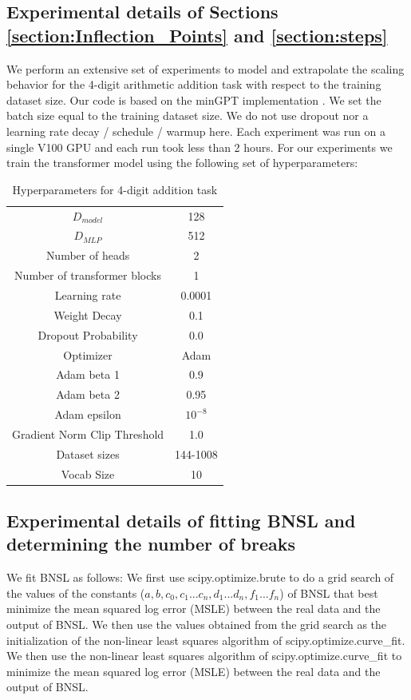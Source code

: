 \documentclass{article} %
\begin{document}
\subsection{Experimental details of Sections \ref{section:Inflection_Points} and \ref{section:steps}}
\label{section:Inflection_points_experimental}
We perform an extensive set of experiments to model and extrapolate the scaling behavior for the 4-digit arithmetic addition task with respect to the training dataset size. Our code is based on the minGPT implementation \citep{Karpathy2020}. We set the batch size equal to the training dataset size. We do not use dropout %
nor a learning rate decay / schedule / warmup here. Each experiment was run on a single V100 GPU and each run took less than 2 hours. For our experiments we train the transformer model using the following set of hyperparameters:
\begin{table}[hbt!]
    \centering
    \begin{tabular}{c|c}
         $D_{model}$ & 128 \\
         $D_{MLP}$ & 512 \\
         Number of heads & 2 \\
         Number of transformer blocks & 1 \\
         Learning rate & 0.0001\\
         Weight Decay & 0.1\\
         Dropout Probability & 0.0\\
         Optimizer & Adam %
         \\
         Adam beta 1 & 0.9\\
         Adam beta 2 & 0.95 \\
         Adam epsilon & $10^{-8}$\\
         Gradient Norm Clip Threshold & 1.0 \\
         Dataset sizes & 144-1008 \\
         Vocab Size & 10 \\
         
    \end{tabular}
    \caption{Hyperparameters for 4-digit addition task}
    \label{tab:my_label}
\end{table}

\subsection{Experimental details of fitting BNSL and determining the number of breaks}
\label{section:BNSL_fit_details}
We fit BNSL as follows:
We first use scipy.optimize.brute to do a grid search of the values of the constants ($a, b, c_0, c_1 ... c_n, d_1 ...  d_n, f_1 ... f_n$) of BNSL that best minimize the mean squared log error (MSLE) between the real data and the output of BNSL.
We then use the values obtained from the grid search as the initialization of the non-linear least squares algorithm of scipy.optimize.curve\_fit.
We then use the non-linear least squares algorithm of scipy.optimize.curve\_fit to minimize the mean squared log error (MSLE) between the real data and the output of BNSL.
\end{document}
